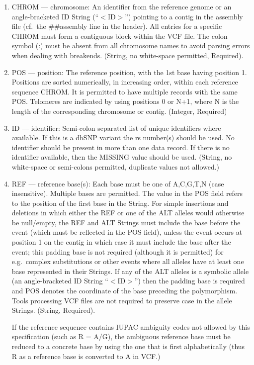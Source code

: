 \documentclass[8pt]{article}
\begin{document}
\begin{enumerate}
  \item CHROM --- chromosome: An identifier from the reference genome or an angle-bracketed ID String (``$<$ID$>$'') pointing to a contig in the assembly file (cf.\ the \#\#assembly line in the header).
  All entries for a specific CHROM must form a contiguous block within the VCF file.
  The colon symbol (:) must be absent from all chromosome names to avoid parsing errors when dealing with breakends.
  (String, no white-space permitted, Required).
  \item POS --- position: The reference position, with the 1st base having position 1.
  Positions are sorted numerically, in increasing order, within each reference sequence CHROM.
  It is permitted to have multiple records with the same POS.
  Telomeres are indicated by using positions 0 or N+1, where N is the length of the corresponding chromosome or contig.
  (Integer, Required)
  \item ID --- identifier: Semi-colon separated list of unique identifiers where available.
  If this is a dbSNP variant the rs number(s) should be used.
  No identifier should be present in more than one data record.
  If there is no identifier available, then the MISSING value should be used.
  (String, no white-space or semi-colons permitted, duplicate values not allowed.)
  \item REF --- reference base(s): Each base must be one of A,C,G,T,N (case insensitive).
  Multiple bases are permitted.
  The value in the POS field refers to the position of the first base in the String.
  For simple insertions and deletions in which either the REF or one of the ALT alleles would otherwise be null/empty, the REF and ALT Strings must include the base before the event (which must be reflected in the POS field), unless the event occurs at position 1 on the contig in which case it must include the base after the event; \pagebreak[1] this padding base is not required (although it is permitted) for e.g.\ complex substitutions or other events where all alleles have at least one base represented in their Strings.
  If any of the ALT alleles is a symbolic allele (an angle-bracketed ID String ``$<$ID$>$'') then the padding base is required and POS denotes the coordinate of the base preceding the polymorphism.
  Tools processing VCF files are not required to preserve case in the allele Strings. (String, Required).

  If the reference sequence contains IUPAC ambiguity codes not allowed by this specification (such as R = A/G), the ambiguous reference base must be reduced to a concrete base by using the one that is first alphabetically (thus R as a reference base is converted to A in VCF.)


\end{enumerate}
\end{document}
